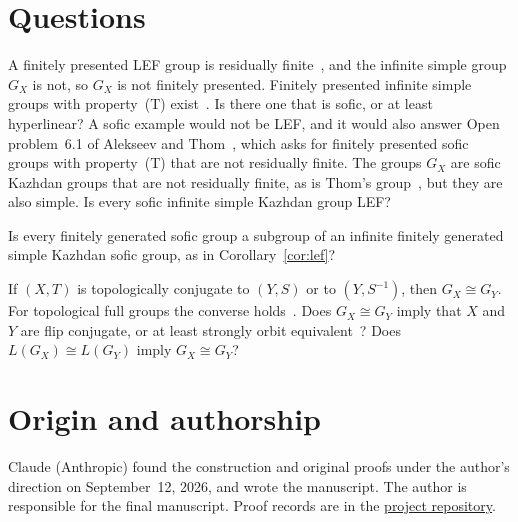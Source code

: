 \documentclass[11pt]{amsart}
\begin{document}
\section{Questions}

A finitely presented LEF group is residually
finite~\cite{Stepin,VershikGordon}, and the infinite simple group $G_X$ is
not, so $G_X$ is not finitely presented. Finitely presented infinite
simple groups with property~\textup{(T)} exist~\cite{CapraceRemy}. Is
there one that is sofic, or at least hyperlinear? A sofic example would
not be LEF, and it would also answer Open problem~6.1 of Alekseev and
Thom~\cite{AlekseevThom}, which asks for finitely presented sofic groups
with property~\textup{(T)} that are not residually finite. The groups
$G_X$ are sofic Kazhdan groups that are not residually finite, as is
Thom's group~\cite[\S5]{AlekseevThom}, but they are also simple. Is every
sofic infinite simple Kazhdan group LEF?

Is every finitely generated sofic group a subgroup of an infinite finitely
generated simple Kazhdan sofic group, as in Corollary~\ref{cor:lef}?

If $(X,T)$ is topologically conjugate to $(Y,S)$ or to $(Y,S^{-1})$, then
$G_X\cong G_Y$. For topological full groups the converse
holds~\cite{GPS99,BezuglyiMedynets}. Does $G_X\cong G_Y$ imply that $X$
and $Y$ are flip conjugate, or at least strongly orbit
equivalent~\cite{GPS}? Does $L(G_X)\cong L(G_Y)$ imply $G_X\cong G_Y$?

\section*{Origin and authorship}
Claude (Anthropic) found the construction and original proofs under
the author's direction on September~12, 2026, and wrote the manuscript.
The author is responsible for the final manuscript. Proof records are
in the \href{https://github.com/SauersML/group-approximation}{project repository}.
\end{document}
